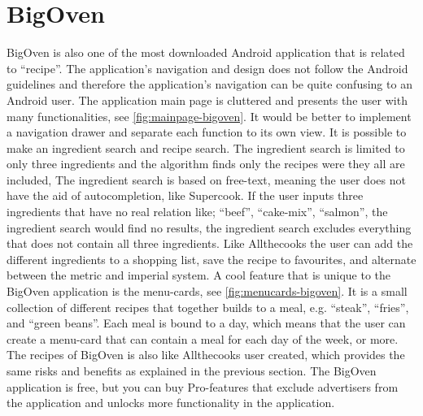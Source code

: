 \section{BigOven}
BigOven is also one of the most downloaded \cite{bigoven-googleplay} Android application that is related to ``recipe''. The application's navigation and design does not follow the Android guidelines\cite{guidelines-appstructure} and therefore the application's navigation can be quite confusing to an Android user.
The application main page is cluttered and presents the user with many functionalities, see \autoref{fig:mainpage-bigoven}. It would be better to implement a navigation drawer and separate each function to its own view.
It is possible to make an ingredient search and recipe search. The ingredient search is limited to only three ingredients and the algorithm finds only the recipes were they all are included, The ingredient search is based on free-text, meaning the user does not have the aid of autocompletion, like Supercook. If the user inputs three ingredients that have no real relation like; ``beef'', ``cake-mix'', ``salmon'', the ingredient search would find no results, the ingredient search excludes everything that does not contain all three ingredients.
Like Allthecooks the user can add the different ingredients to a shopping list, save the recipe to favourites, and alternate between the metric and imperial system.
A cool feature that is unique to the BigOven application is the menu-cards, see \autoref{fig:menucards-bigoven}.
It is a small collection of different recipes that together builds to a meal, e.g. ``steak'', ``fries'', and ``green beans''. Each meal is bound to a day, which means that the user can create a menu-card that can contain a meal for each day of the week, or more.
The recipes of BigOven is also like Allthecooks user created, which provides the same risks and benefits as explained in the previous section.
The BigOven application is free, but you can buy Pro-features that exclude advertisers from the application and unlocks more functionality in the application.

